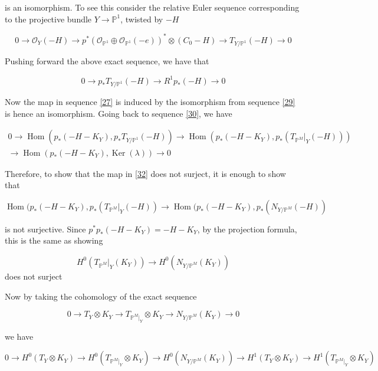 \documentclass[11pt,twoside]{amsart}
\theoremstyle{plain}
\numberwithin{equation}{section}
\theoremstyle{definition}
\begin{document}
is an isomorphism. To see this consider the relative Euler sequence corresponding to the projective bundle $Y \to \mathbb{P}^1$, twisted by $-H$ 

\begin{equation}\label{28}
0 \to \mathcal{O}_Y(-H) \to p^*(\mathcal{O}_{\mathbb{P}^1} \oplus \mathcal{O}_{\mathbb{P}^1}(-e))^* \otimes (C_0-H) \to T_{Y/\mathbb{P}^1}(-H) \to 0
\end{equation}

Pushing forward the above exact sequence, we have that 

\begin{equation}\label{29}
 0 \to p_*T_{Y/\mathbb{P}^1}(-H) \to R^1p_*(-H) \to 0 
\end{equation}

Now the map in sequence \ref{27} is induced by the isomorphism from sequence \ref{29} is hence an isomorphism. Going back to sequence \ref{30}, we have 

\begin{multline}\label{31}
0 \to \operatorname{Hom}(p_*(-H-K_Y), 
 p_*T_{Y/\mathbb{P}^1}(-H))  \to \operatorname{Hom}(p_*(-H-K_Y), p_*(T_{\mathbb{P}^M}|_Y(-H))) \\ \to \operatorname{Hom}(p_*(-H-K_Y),\operatorname{Ker}(\lambda)) \to 0
\end{multline}

Therefore, to show that the map in \ref{32} does not surject, it is enough to show that

\begin{equation}\label{33}
  \operatorname{Hom}(p_*(-H-K_Y), p_*(T_{\mathbb{P}^M}|_Y(-H)) \to \operatorname{Hom}(p_*(-H-K_Y), p_*(N_{Y/\mathbb{P}^M}(-H))  
\end{equation}

is not surjective. Since $p^*p_*(-H-K_Y) = -H-K_Y$, by the projection formula, this is the same as showing 

\begin{equation}\label{34}
   H^0(T_{\mathbb{P}^M}|_Y(K_Y)) \to H^0(N_{Y/\mathbb{P}^M}(K_Y)) 
\end{equation}
does not surject

Now by taking the cohomology of the exact sequence 

$$0 \to T_Y \otimes K_Y \to T_{\mathbb{P}^M|_Y} \otimes K_Y \to N_{Y/\mathbb{P}^M}(K_Y) \to 0$$


we have 

$$0 \to H^0(T_Y \otimes K_Y) \to H^0(T_{\mathbb{P}^M|_Y} \otimes K_Y) \to H^0(N_{Y/\mathbb{P}^M}(K_Y)) \to H^1(T_Y \otimes K_Y) \to H^1(T_{\mathbb{P}^M|_Y} \otimes K_Y)$$
\end{document}
